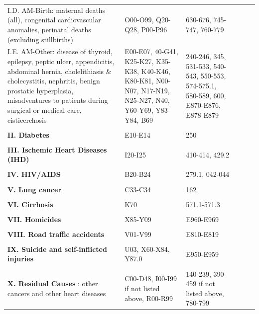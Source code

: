 \documentclass[11.5pt]{article}
\begin{document}
{\begin{longtable}{p{8cm}p{4cm}p{4cm}ccc}
          I.D. AM-Birth: maternal deaths (all), congenital cardiovascular anomalies, perinatal deaths (excluding stillbirths) & O00-O99, Q20-Q28, P00-P96 & 630-676, 745-747, 760-779\\
          I.E. AM-Other: disease of thyroid, epilepsy, peptic ulcer, appendicitis, abdominal hernia, cholelithiasis \& cholecystitis, nephritis, benign prostatic hyperplasia, misadventures to patients during surgical or medical care, cisticerchosis & E00-E07, 40-G41, K25-K27, K35-K38, K40-K46, K80-K81,  N00-N07, N17-N19, N25-N27, N40, Y60-Y69, Y83-Y84, B69 & 240-246, 345, 531-533, 540-543, 550-553, 574-575.1, 580-589, 600, E870-E876, E878-E879\\
 & \\          
 {\bf II. Diabetes}  & E10-E14 & 250 \\      
 & \\
 {\bf III. Ischemic Heart Diseases (IHD)}   & I20-I25 & 410-414, 429.2\\
 & \\           
 {\bf IV. HIV/AIDS} & B20-B24 & 279.1, 042-044\\ 
  & \\                
{\bf V. Lung cancer}  & C33-C34 & 162\\
  & \\          
{\bf VI. Cirrhosis}&  K70 & 571.1-571.3\\
 & \\          
{\bf VII. Homicides}  & X85-Y09 & E960-E969\\     
 & \\           
 {\bf VIII. Road traffic accidents}  & V01-V99 & E810-E819 \\     
 & \\           
{\bf IX. Suicide and self-inflicted injuries}  & U03, X60-X84, Y87.0 & E950-E959\\ 
 & \\          
{\bf X. Residual Causes }:  other cancers and other heart diseases & C00-D48, I00-I99 if not listed above, R00-R99 & 140-239, 390-459 if not listed above, 780-799
\label{ME_Mex}
\end{longtable}


}
\end{document}
